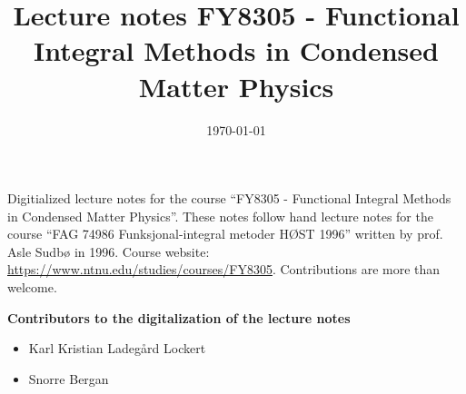 \documentclass{article}
\title{Lecture notes FY8305 - Functional Integral Methods in Condensed Matter Physics}
\date{\today}
\theoremstyle{definition}
\newcommand{\contribs}{%
\begin{center}
\large 
\textbf{Contributors to the digitalization of the lecture notes}
\end{center}
\begin{itemize}
\item Karl Kristian Ladegård Lockert
\item Snorre Bergan
\end{itemize}

}
\begin{document}
\maketitle
\newpage
Digitialized lecture notes for the course ``FY8305 - Functional Integral Methods in Condensed Matter Physics''.
These notes follow hand lecture notes for the course ``FAG 74986 Funksjonal-integral metoder HØST 1996'' written by prof. Asle Sudbø in 1996.
Course website: \href{https://www.ntnu.edu/studies/courses/FY8305}{\color{blue!80!white}https://www.ntnu.edu/studies/courses/FY8305}. Contributions are more than welcome. 
\contribs
\tableofcontents








%
%







%




\end{document}
